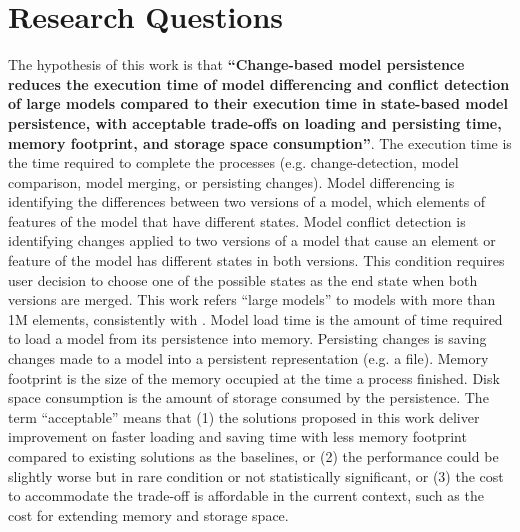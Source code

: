 \section{Research Questions}
\label{sec:research_questions}
The hypothesis of this work is that \textbf{``Change-based model persistence reduces the execution time of model differencing and conflict detection of large models compared to their execution time in state-based model persistence, with acceptable trade-offs on loading and persisting time, memory footprint, and storage space consumption''}. The execution time is the time required to complete the processes (e.g. change-detection, model comparison, model merging, or persisting changes). Model differencing is identifying the differences between two  versions of a model, which elements of features of the model that have different states. Model conflict detection is identifying changes applied to two versions of a model that cause an element or feature of the model has different states in both versions. This condition requires user decision to choose one of the possible states as the end state when both versions are merged.  This work refers ``large models'' to models with more than 1M elements, consistently with \cite{daniel2016neoemf,DBLP:conf/models/Espinazo-PaganCM11}. Model load time is the amount of time required to load a model from its persistence into memory. Persisting changes is saving changes made to a model into a persistent representation (e.g. a file). Memory footprint is the size of the memory occupied  at the time a process finished. Disk space consumption is the amount of storage consumed by the persistence. The term ``acceptable'' means that (1) the solutions proposed in this work deliver improvement on faster loading and saving time with less memory footprint compared to existing solutions as the baselines, or (2) the performance could be slightly worse but in rare condition or not statistically significant, or (3) the cost to accommodate the trade-off is affordable in the current context, such as the cost for extending memory and storage space.


